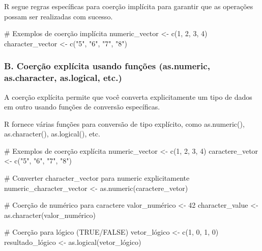 \documentclass[
  letterpaper,
  DIV=11,
  numbers=noendperiod]{scrartcl}
\newenvironment{Shaded}{\begin{snugshade}}{\end{snugshade}}
\newcommand{\CommentTok}[1]{\textcolor[rgb]{0.37,0.37,0.37}{#1}}
\newcommand{\DecValTok}[1]{\textcolor[rgb]{0.68,0.00,0.00}{#1}}
\newcommand{\FunctionTok}[1]{\textcolor[rgb]{0.28,0.35,0.67}{#1}}
\newcommand{\NormalTok}[1]{\textcolor[rgb]{0.00,0.23,0.31}{#1}}
\newcommand{\OtherTok}[1]{\textcolor[rgb]{0.00,0.23,0.31}{#1}}
\newcommand{\StringTok}[1]{\textcolor[rgb]{0.13,0.47,0.30}{#1}}
\begin{document}
R segue regras específicas para coerção implícita para garantir que as
operações possam ser realizadas com sucesso.

\begin{Shaded}
\begin{Highlighting}[]
\CommentTok{\# Exemplos de coerção implícita}
\NormalTok{numeric\_vector }\OtherTok{\textless{}{-}} \FunctionTok{c}\NormalTok{(}\DecValTok{1}\NormalTok{, }\DecValTok{2}\NormalTok{, }\DecValTok{3}\NormalTok{, }\DecValTok{4}\NormalTok{)}
\NormalTok{character\_vector }\OtherTok{\textless{}{-}} \FunctionTok{c}\NormalTok{(}\StringTok{"5"}\NormalTok{, }\StringTok{"6"}\NormalTok{, }\StringTok{"7"}\NormalTok{, }\StringTok{"8"}\NormalTok{)}
\end{Highlighting}
\end{Shaded}

\hypertarget{b.-coeruxe7uxe3o-expluxedcita-usando-funuxe7uxf5es-as.numeric-as.character-as.logical-etc.}{%
\subsubsection{B. Coerção explícita usando funções (as.numeric,
as.character, as.logical,
etc.)}\label{b.-coeruxe7uxe3o-expluxedcita-usando-funuxe7uxf5es-as.numeric-as.character-as.logical-etc.}}

A coerção explícita permite que você converta explicitamente um tipo de
dados em outro usando funções de conversão específicas.

R fornece várias funções para conversão de tipo explícito, como
as.numeric(), as.character(), as.logical(), etc.

\begin{Shaded}
\begin{Highlighting}[]
\CommentTok{\# Exemplos de coerção explícita}
\NormalTok{numeric\_vector }\OtherTok{\textless{}{-}} \FunctionTok{c}\NormalTok{(}\DecValTok{1}\NormalTok{, }\DecValTok{2}\NormalTok{, }\DecValTok{3}\NormalTok{, }\DecValTok{4}\NormalTok{)}
\NormalTok{caractere\_vetor }\OtherTok{\textless{}{-}} \FunctionTok{c}\NormalTok{(}\StringTok{"5"}\NormalTok{, }\StringTok{"6"}\NormalTok{, }\StringTok{"7"}\NormalTok{, }\StringTok{"8"}\NormalTok{)}

\CommentTok{\# Converter character\_vector para numeric explicitamente}
\NormalTok{numeric\_character\_vector }\OtherTok{\textless{}{-}} \FunctionTok{as.numeric}\NormalTok{(caractere\_vetor)}

\CommentTok{\# Coerção de numérico para caractere}
\NormalTok{valor\_numérico }\OtherTok{\textless{}{-}} \DecValTok{42}
\NormalTok{character\_value }\OtherTok{\textless{}{-}} \FunctionTok{as.character}\NormalTok{(valor\_numérico)}

\CommentTok{\# Coerção para lógico (TRUE/FALSE)}
\NormalTok{vetor\_lógico }\OtherTok{\textless{}{-}} \FunctionTok{c}\NormalTok{(}\DecValTok{1}\NormalTok{, }\DecValTok{0}\NormalTok{, }\DecValTok{1}\NormalTok{, }\DecValTok{0}\NormalTok{)}
\NormalTok{resultado\_lógico }\OtherTok{\textless{}{-}} \FunctionTok{as.logical}\NormalTok{(vetor\_lógico)}
\end{Highlighting}
\end{Shaded}
\end{document}

